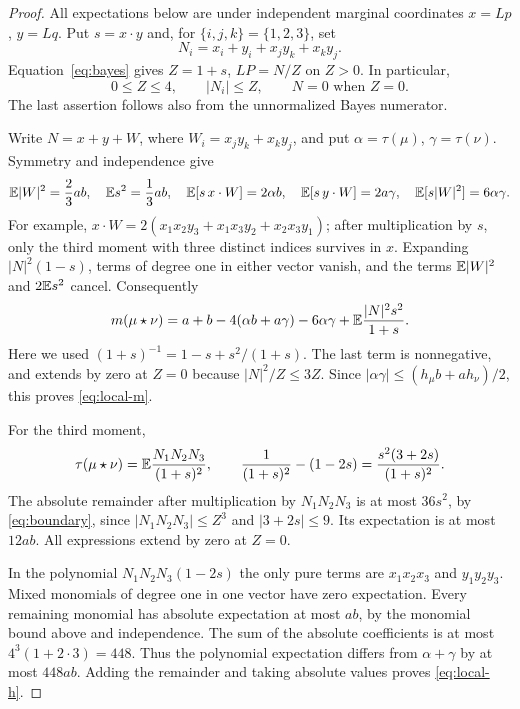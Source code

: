 \begin{proof}
All expectations below are under independent marginal coordinates
$x=Lp$, $y=Lq$. Put $s=x\cdot y$ and, for
$\{i,j,k\}=\{1,2,3\}$, set
\[
 N_i=x_i+y_i+x_jy_k+x_ky_j.
\]
Equation~\eqref{eq:bayes} gives $Z=1+s$, $LP=N/Z$ on $Z>0$.
In particular,
\begin{equation}\label{eq:boundary}
 0\leq Z\leq4,\qquad |N_i|\leq Z,
 \qquad N=0\text{ when }Z=0.
\end{equation}
The last assertion follows also from the unnormalized Bayes numerator.

Write $N=x+y+W$, where $W_i=x_jy_k+x_ky_j$, and put
$\alpha=\tau(\mu)$, $\gamma=\tau(\nu)$.
Symmetry and independence give
\[
 \mathbb E|W|^2=\frac23ab,\quad \mathbb E s^2=\frac13ab,\quad
 \mathbb E[s\,x\cdot W]=2\alpha b,\quad
 \mathbb E[s\,y\cdot W]=2a\gamma,\quad
 \mathbb E[s|W|^2]=6\alpha\gamma.
\]
For example, $x\cdot W=2(x_1x_2y_3+x_1x_3y_2+x_2x_3y_1)$;
after multiplication by $s$, only the third moment with three distinct
indices survives in $x$. Expanding $|N|^2(1-s)$, terms of degree one
in either vector vanish, and the terms $\mathbb E|W|^2$ and $2\mathbb E s^2$
cancel. Consequently
\begin{equation}\label{eq:exact-m}
 m(\mu\star\nu)=a+b-4(\alpha b+a\gamma)-6\alpha\gamma
                  +\mathbb E\frac{|N|^2s^2}{1+s}.
\end{equation}
Here we used $(1+s)^{-1}=1-s+s^2/(1+s)$. The last term is
nonnegative, and extends by zero at $Z=0$ because
$|N|^2/Z\leq3Z$. Since
$|\alpha\gamma|\leq(h_\mu b+a h_\nu)/2$, this proves
\eqref{eq:local-m}.

For the third moment,
\[
 \tau(\mu\star\nu)=\mathbb E\frac{N_1N_2N_3}{(1+s)^2},\qquad
 \frac1{(1+s)^2}-(1-2s)=\frac{s^2(3+2s)}{(1+s)^2}.
\]
The absolute remainder after multiplication by $N_1N_2N_3$ is at
most $36s^2$, by \eqref{eq:boundary}, since
$|N_1N_2N_3|\leq Z^3$ and $|3+2s|\leq9$. Its expectation
is at most $12ab$. All expressions extend by zero at $Z=0$.

In the polynomial $N_1N_2N_3(1-2s)$ the only pure terms are
$x_1x_2x_3$ and $y_1y_2y_3$. Mixed monomials of degree one in
one vector have zero expectation. Every remaining monomial has
absolute expectation at most $ab$, by the monomial bound above and
independence. The sum of the absolute coefficients is at most
$4^3(1+2\cdot3)=448$. Thus the polynomial expectation differs
from $\alpha+\gamma$ by at most $448ab$. Adding the remainder
and taking absolute values proves \eqref{eq:local-h}.
\end{proof}
